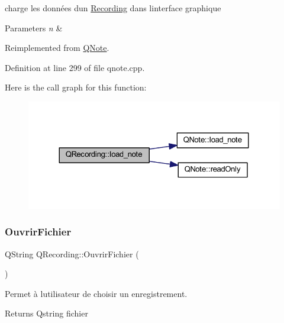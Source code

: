 charge les données d\textquotesingle{}un \hyperlink{class_recording}{Recording} dans l\textquotesingle{}interface graphique 


\begin{DoxyParams}{Parameters}
{\em n} & \\
\hline
\end{DoxyParams}


Reimplemented from \hyperlink{class_q_note_adca0a8f2851fbb1c3843ca4fe7957c11}{Q\+Note}.



Definition at line 299 of file qnote.\+cpp.

Here is the call graph for this function\+:\nopagebreak
\begin{figure}[H]
\begin{center}
\leavevmode
\includegraphics[width=324pt]{class_q_recording_aa6984351b5a0bceaa63be793b160c73b_cgraph}
\end{center}
\end{figure}
\mbox{\label{class_q_recording_a9eaf976da6c3c768d15a5e53f3982753}} 
\subsubsection{\texorpdfstring{Ouvrir\+Fichier}{OuvrirFichier}}
{\footnotesize\ttfamily Q\+String Q\+Recording\+::\+Ouvrir\+Fichier (\begin{DoxyParamCaption}{ }\end{DoxyParamCaption})\hspace{0.3cm}{\ttfamily [slot]}}



Permet à l\textquotesingle{}utilisateur de choisir un enregistrement. 

\begin{DoxyReturn}{Returns}
Qstring fichier 
\end{DoxyReturn}


